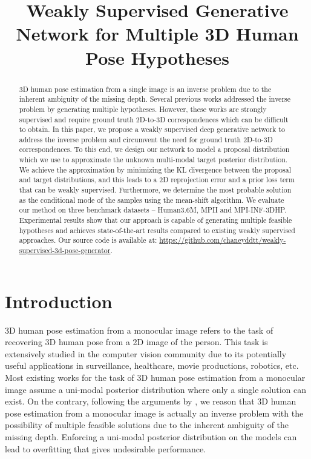 \documentclass{bmvc2k}
\title{Weakly Supervised Generative Network for Multiple 3D Human Pose Hypotheses}
\begin{document}
\maketitle

\begin{abstract}
3D human pose estimation from a single image is an inverse problem 
due to the inherent ambiguity of the missing depth. 
Several previous works addressed the inverse problem by generating multiple hypotheses. However, these works are strongly supervised and require ground truth 2D-to-3D correspondences which can be difficult to obtain. In this paper, we propose a weakly supervised deep generative network to address the inverse problem and circumvent the need for ground truth 2D-to-3D correspondences. To this end, we design our network to model a proposal distribution which we use to approximate the unknown multi-modal target posterior distribution. We achieve the approximation by minimizing the KL divergence between the proposal and target distributions, and this leads to a 2D reprojection error and a prior loss term that can be weakly supervised. Furthermore, we determine the most probable solution as the conditional mode of the samples using the mean-shift algorithm.
We evaluate our method on three benchmark datasets -- Human3.6M, MPII and MPI-INF-3DHP.
Experimental results show that 
our approach is capable of generating multiple feasible hypotheses and achieves state-of-the-art results compared to existing weakly supervised approaches. Our source code is available at: \url{https://github.com/chaneyddtt/weakly-supervised-3d-pose-generator}.
\end{abstract}

\section{Introduction}
\label{sec:intro}
3D human pose estimation from a monocular image refers to the task of recovering 3D human pose from a 2D image of the person. This task is extensively studied in the computer vision community due to its potentially useful applications in surveillance, healthcare, movie productions, robotics, etc. Most existing works for the task of 3D human pose estimation from a monocular image assume a uni-modal posterior distribution where only a single solution can exist. On the contrary, following the arguments by \cite{Li_2019_CVPR, jahangiri2017generating}, we reason that 3D human pose estimation from a monocular image is actually an inverse problem with the possibility of multiple feasible solutions due to the inherent ambiguity of the missing depth. Enforcing a uni-modal posterior distribution on the models can lead to overfitting that gives undesirable performance. 
\end{document}
